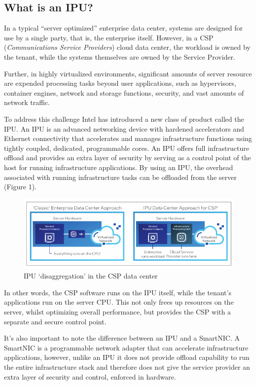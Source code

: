 \documentclass[../sn.tex]{subfiles}
\begin{document}
\subsection{What is an IPU?}
In a typical “server optimized” enterprise data center, systems
are designed for use by a single party, that is, the enterprise itself.
However, in a CSP (\textit{Communications Service Providers}) cloud data center, the workload is owned by
the tenant, while the systems themselves are owned by the
Service Provider.

Further, in highly virtualized environments, significant amounts
of server resource are expended processing tasks beyond user
applications, such as hypervisors, container engines, network
and storage functions, security, and vast amounts of network
traffic.

To address this challenge Intel has introduced a new class of
product called the IPU. An IPU is an advanced networking device
with hardened accelerators and Ethernet connectivity that
accelerates and manages infrastructure functions using tightly
coupled, dedicated, programmable cores. An IPU offers full
infrastructure offload and provides an extra layer of security by
serving as a control point of the host for running infrastructure
applications. By using an IPU, the overhead associated with running
infrastructure tasks can be offloaded from the server (Figure 1).

\begin{figure}
    \centering
    \includegraphics[width=\textwidth]{images/ipu1.png}
    \caption{IPU ‘disaggregation’ in the CSP data center}
\end{figure}

In other words, the CSP software runs on the IPU itself, while the
tenant’s applications run on the server CPU. This not only frees
up resources on the server, whilst optimizing overall
performance, but provides the CSP with a separate and secure
control point.

It’s also important to note the difference between an IPU and
a SmartNIC. A SmartNIC is a programmable network adapter
that can accelerate infrastructure applications, however,
unlike an IPU it does not provide offload capability to run the
entire infrastructure stack and therefore does not give the
service provider an extra layer of security and control,
enforced in hardware.
\end{document}
